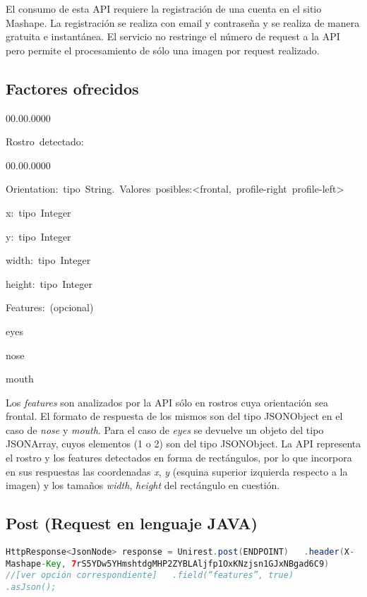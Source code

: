 El consumo de esta API requiere la registración de una cuenta en el
sitio Mashape. La registración se realiza con email y contraseña y
se realiza de manera gratuita e instantánea. El servicio no restringe
el número de request a la API pero permite el procesamiento de sólo
una imagen por request realizado. 


\subsection*{Factores ofrecidos }
\begin{lyxlist}{00.00.0000}
\item [{Rostro~detectado:}]~

\begin{lyxlist}{00.00.0000}
\item [{Orientation:~tipo~String.~Valores~posibles:<frontal,~profile-right~profile-left>}]~
\item [{x:~tipo~Integer}]~
\item [{y:~tipo~Integer}]~
\item [{width:~tipo~Integer}]~
\item [{height:~tipo~Integer}]~
\item [{Features:~(opcional)}]~
\item [{eyes}]~
\item [{nose}]~
\item [{mouth}]~
\end{lyxlist}
\end{lyxlist}
Los \emph{features} son analizados por la API sólo en rostros cuya
orientación sea frontal. El formato de respuesta de los mismos son
del tipo JSONObject en el caso de \emph{nose} y \emph{mouth}. Para
el caso de \emph{eyes} se devuelve un objeto del tipo JSONArray, cuyos
elementos (1 o 2) son del tipo JSONObject. La API representa el rostro
y los features detectados en forma de rectángulos, por lo que incorpora
en sus respuestas las coordenadas \emph{x}, \emph{y} (esquina superior
izquierda respecto a la imagen) y los tamaños \emph{width}, \emph{height}
del rectángulo en cuestión.


\subsection*{Post (Request en lenguaje JAVA)}

\lstinline[language=Java,numbers=left,numberstyle={\tiny},basicstyle={\footnotesize},breaklines=true,captionpos=t,frame=no,keywordstyle={\color{blue}},commentstyle={\color{gray}},stringstyle={\color{red}},numbersep=5pt,emph={label}]!HttpResponse<JsonNode> response = Unirest.post(ENDPOINT) 	.header(X-Mashape-Key, 7rS5YDw5YHmshtdgMHP2ZYBLAljfp1OxKNzjsn1GJxNBgad6C9) //[ver opción correspondiente] 	.field(“features”, true) 	.asJson();        !

